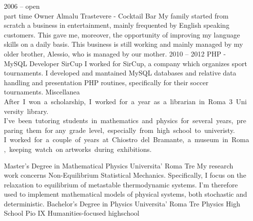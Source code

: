 \documentclass[9pt]{developercv} %
\begin{document}
\begin{entrylist}
	\entry
		{2006 -- open\\\footnotesize{part time}}
		{Owner}
		{Almalu Trastevere - Cocktail Bar}
		{My family started from scratch a business in entertainment, mainly frequented by English speaking customers. This
gave me, moreover, the opportunity of improving my language skills on a daily basis. This business is still working
and mainly managed by my older brother, Alessio, who is managed by our mother.}
	\entry
		{2010 -- 2012} %
		{PHP - MySQL Developer}
		{SirCup}
		{I worked for SirCup, a company which organizes sport
tournaments. I developed and mantained MySQL databases
and relative data handling and presentation PHP routines,
specifically for their soccer tournaments.}
	\entry
	    { Miscellanea }
	    {}
	    {}
	    {\mbox{After I won a scholarship, I worked for a year as a librarian
in Roma 3 University library.} \linebreak \mbox{I’ve been tutoring students in mathematics and physics for
several years, preparing them for} \linebreak \mbox{any grade level, especially
from high school to univeristy.} \linebreak \mbox{I worked for a couple of years at Chiostro del Bramante, a museum in Roma, keeping watch on} \linebreak \mbox{artworks during exhibitions.}}
\end{entrylist}



\begin{entrylist}
	\entry
		{}
		{Master's Degree in Mathematical Physics}
		{Universita' Roma Tre}
		{My research work concerns Non-Equilibrium Statistical Mechanics. Specifically,
I focus on the relaxation to equilibrium of metastable thermodynamic systems.
I’m therefore used to implement mathematical models of physical systems, both
stochastic and deterministic.}
	\entry
		{}
		{Bachelor's Degree in Physics}
		{Universita' Roma Tre}
		{Physics}
	\entry
		{}
		{High School}
		{Pio IX}
		{Humanities-focused highschool}
\end{entrylist}
\end{document}

